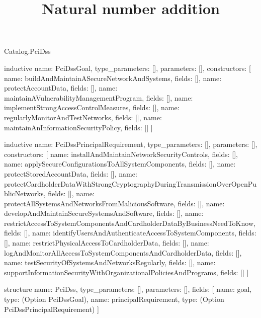 \begin{lexlean}{Catalog.PciDss}
\title{Natural number addition}
\begin{semanticmodule}
inductive{
  name: PciDssGoal,
  type_parameters: [],
  parameters: [],
  constructors: [
    {name: buildAndMaintainASecureNetworkAndSystems, fields: []},
    {name: protectAccountData, fields: []},
    {name: maintainAVulnerabilityManagementProgram, fields: []},
    {name: implementStrongAccessControlMeasures, fields: []},
    {name: regularlyMonitorAndTestNetworks, fields: []},
    {name: maintainAnInformationSecurityPolicy, fields: []}
  ]
}

inductive{
  name: PciDssPrincipalRequirement,
  type_parameters: [],
  parameters: [],
  constructors: [
    {name: installAndMaintainNetworkSecurityControls, fields: []},
    {name: applySecureConfigurationsToAllSystemComponents, fields: []},
    {name: protectStoredAccountData, fields: []},
    {name: protectCardholderDataWithStrongCryptographyDuringTransmissionOverOpenPublicNetworks, fields: []},
    {name: protectAllSystemsAndNetworksFromMaliciousSoftware, fields: []},
    {name: developAndMaintainSecureSystemsAndSoftware, fields: []},
    {name: restrictAccessToSystemComponentsAndCardholderDataByBusinessNeedToKnow, fields: []},
    {name: identifyUsersAndAuthenticateAccessToSystemComponents, fields: []},
    {name: restrictPhysicalAccessToCardholderData, fields: []},
    {name: logAndMonitorAllAccessToSystemComponentsAndCardholderData, fields: []},
    {name: testSecurityOfSystemsAndNetworksRegularly, fields: []},
    {name: supportInformationSecurityWithOrganizationalPoliciesAndPrograms, fields: []}
  ]
}

structure{
  name: PciDss,
  type_parameters: [],
  parameters: [],
  fields: [
    {name: goal, type: (Option PciDssGoal)},
    {name: principalRequirement, type: (Option PciDssPrincipalRequirement)}
  ]
}
\end{semanticmodule}
\end{lexlean}
